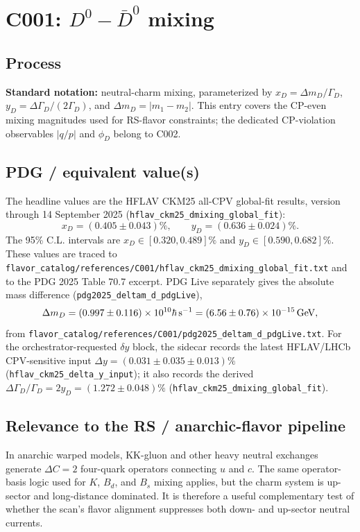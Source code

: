 
\section{\texorpdfstring{C001: \(D^0-\bar D^0\) mixing}{C001: D0-D0bar mixing}}

\subsection*{Process}
\textbf{Standard notation:} neutral-charm mixing, parameterized by
\(x_D=\Delta m_D/\Gamma_D\), \(y_D=\Delta\Gamma_D/(2\Gamma_D)\), and
\(\Delta m_D=|m_1-m_2|\).  This entry covers the CP-even mixing magnitudes
used for RS-flavor constraints; the dedicated CP-violation observables
\(|q/p|\) and \(\phi_D\) belong to C002.

\subsection*{PDG / equivalent value(s)}
The headline values are the HFLAV CKM25 all-CPV global-fit results, version
through 14 September 2025 (\texttt{hflav\_ckm25\_dmixing\_global\_fit}):
\[
  x_D=(0.405\pm0.043)\%,\qquad
  y_D=(0.636\pm0.024)\%.
\]
The 95\% C.L. intervals are \(x_D\in[0.320,0.489]\%\) and
\(y_D\in[0.590,0.682]\%\).  These values are traced to
\texttt{flavor\_catalog/references/C001/hflav\_ckm25\_dmixing\_global\_fit.txt}
and to the PDG 2025 Table 70.7 excerpt.  PDG Live separately gives the
absolute mass difference (\texttt{pdg2025\_deltam\_d\_pdgLive}),
\[
  \Delta m_D=(0.997\pm0.116)\times10^{10}\hbar\,{\rm s}^{-1}
             =(6.56\pm0.76)\times10^{-15}\,{\rm GeV},
\]
from \texttt{flavor\_catalog/references/C001/pdg2025\_deltam\_d\_pdgLive.txt}.
For the orchestrator-requested \(\delta y\) block, the sidecar records the
latest HFLAV/LHCb CPV-sensitive input
\(\Delta y=(0.031\pm0.035\pm0.013)\%\)
(\texttt{hflav\_ckm25\_delta\_y\_input}); it also records the derived
\(\Delta\Gamma_D/\Gamma_D=2y_D=(1.272\pm0.048)\%\)
(\texttt{hflav\_ckm25\_dmixing\_global\_fit}).

\subsection*{Relevance to the RS / anarchic-flavor pipeline}
In anarchic warped models, KK-gluon and other heavy neutral exchanges generate
\(\Delta C=2\) four-quark operators connecting \(u\) and \(c\).  The same
operator-basis logic used for \(K\), \(B_d\), and \(B_s\) mixing applies, but
the charm system is up-sector and long-distance dominated.  It is therefore a
useful complementary test of whether the scan's flavor alignment suppresses
both down- and up-sector neutral currents.

